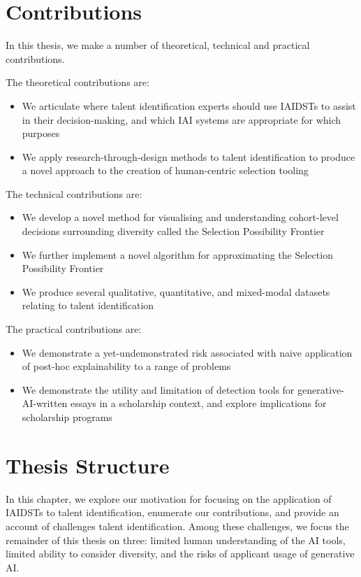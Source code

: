 \section{Contributions}
In this thesis, we make a number of theoretical, technical and practical contributions.

The theoretical contributions are:

\begin{itemize}
    \item We articulate where talent identification experts should use IAIDSTs to assist in their decision-making, and which IAI systems are appropriate for which purposes
    \item We apply research-through-design methods to talent identification to produce a novel approach to the creation of human-centric selection tooling
\end{itemize}

The technical contributions are:

\begin{itemize}
    \item We develop a novel method for visualising and understanding cohort-level decisions surrounding diversity called the Selection Possibility Frontier
    \item We further implement a novel algorithm for approximating the Selection Possibility Frontier
    \item We produce several qualitative, quantitative, and mixed-modal datasets relating to talent identification
\end{itemize}

The practical contributions are:

\begin{itemize}
    \item We demonstrate a yet-undemonstrated risk associated with naive application of post-hoc explainability to a range of problems
    \item We demonstrate the utility and limitation of detection tools for generative-AI-written essays in a scholarship context, and explore implications for scholarship programs
\end{itemize}

\section{Thesis Structure}
In this chapter, we explore our motivation for focusing on the application of IAIDSTs to talent identification, enumerate our contributions, and provide an account of challenges talent identification. Among these challenges, we focus the remainder of this thesis on three: limited human understanding of the AI tools, limited ability to consider diversity, and the risks of applicant usage of generative AI.


